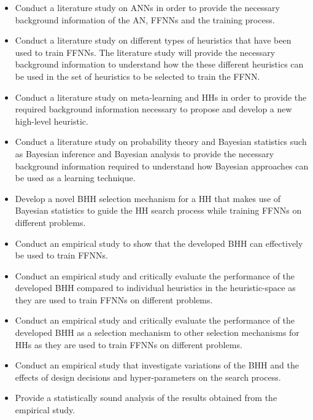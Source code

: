 \begin{itemize}
    \item
    Conduct a literature study on \acp{ANN} in order to provide
    the necessary background information of the \ac{AN}, \acp{FFNN} and the
    training process.

    \item
    Conduct a literature study on different types of heuristics that have been
    used to train \acp{FFNN}. The literature study will provide the necessary
    background information to understand how the these different heuristics can
    be used in the set of heuristics to be selected to train the \ac{FFNN}.

    \item
    Conduct a literature study on meta-learning and
    \acp{HH} in order to provide the required background information
    necessary to propose and develop a new high-level heuristic.
    
    \item
    Conduct a literature study on probability theory and Bayesian statistics
    such as Bayesian inference and Bayesian analysis to provide the necessary
    background information required to understand how Bayesian approaches can be
    used as a learning technique.

    \item
    Develop a novel \Ac{BHH} selection mechanism for a \ac{HH} that makes use
    of Bayesian statistics to guide the \ac{HH} search process while training
    \acp{FFNN} on different problems.

    \item
    Conduct an empirical study to show that the developed \Ac{BHH} can
    effectively be used to train \acp{FFNN}.

    \item
    Conduct an empirical study and critically evaluate the performance of the
    developed \Ac{BHH} compared to individual heuristics in the heuristic-space
    as they are used to train \acp{FFNN} on different problems.

    \item
    Conduct an empirical study and critically evaluate the performance of the
    developed \Ac{BHH} as a selection mechanism to other selection mechanisms
    for \acp{HH} as they are used to train \acp{FFNN} on different problems.

    \item
    Conduct an empirical study that investigate variations of the \Ac{BHH} and the
    effects of design decisions and hyper-parameters on the search process.

    \item
    Provide a statistically sound analysis of the results obtained from the
    empirical study.
\end{itemize}


